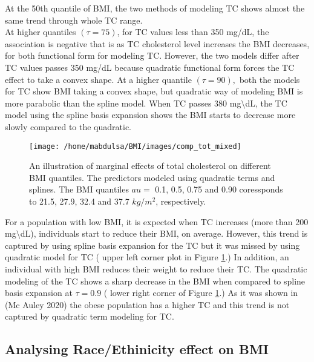 \documentclass[
  12pt,
]{article}
\begin{document}
At the 50th quantile of BMI, the two methods of modeling TC shows almost the same trend through whole TC range.\\
At higher quantiles \((\tau=75)\), for TC values less than 350 mg/dL, the association is negative that is as TC cholesterol level increases the BMI decreases, for both functional form for modeling TC. However, the two models differ after TC values passes 350 mg/dL because quadratic functional form forces the TC effect to take a convex shape.
At a higher quantile \((\tau=90),\) both the models for TC show BMI taking a convex shape, but quadratic way of modeling BMI is more parabolic than the spline model. When TC passes 380 mg\(\setminus\)dL, the TC model using the spline basis expansion shows the BMI starts to decrease more slowly compared to the quadratic.

\begin{figure}
 
 {\centering \texttt{[image: /home/mabdulsa/BMI/images/comp\_tot\_mixed]} 
 
 }
 
 \caption{ An illustration of  marginal effects of total cholesterol  on different BMI quantiles. The predictors modeled using quadratic terms and splines. The BMI quantiles $ au=$ 0.1, 0.5, 0.75 and 0.90 coressponds to  21.5,  27.9,  32.4 and 37.7 $kg/m^2$, respectively. }\label{fig:resu1010}
 \end{figure}

For a population with low BMI, it is expected when TC increases (more than 200 mg\(\setminus\)dL), individuals start to reduce their BMI, on average. However, this trend is captured by using spline basis expansion for the TC but it was missed by using quadratic model for TC ( upper left corner plot in Figure \ref{fig:resu1010}.) In addition, an individual with high BMI reduces their weight to reduce their TC. The quadratic modeling of the TC shows a sharp decrease in the BMI when compared to spline basis expansion at \(\tau=0.9\) ( lower right corner of Figure \ref{fig:resu1010}.) As it was shown in (Mc Auley 2020) the obese population has a higher TC and this trend is not captured by quadratic term modeling for TC.

\subsection{Analysing Race/Ethinicity effect on BMI}
\end{document}
